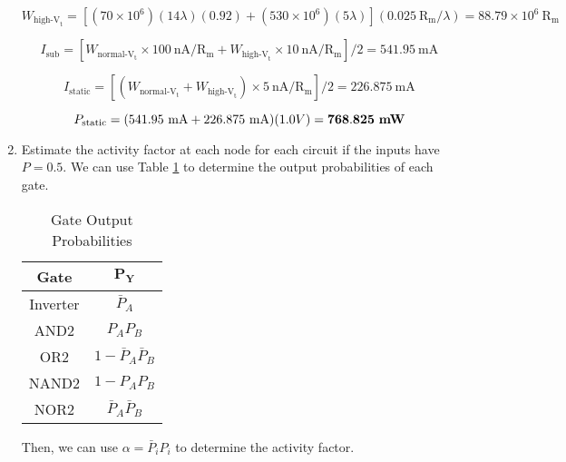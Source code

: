 \documentclass[fleqn]{article}
\begin{document}
\begin{enumerate}
		\begin{equation*}
			W_{\text{high-V}_\text{t}} = \left[(70 \times 10^6)(14\lambda)(0.92) + (530 \times 10^6)(5\lambda)\right](0.025\ \text{R}_\text{m}/\lambda) = 88.79 \times 10^6\ \text{R}_\text{m}
		\end{equation*}
		
		\begin{equation*}
			I_\text{sub} = \left[W_{\text{normal-V}_\text{t}} \times 100\ \text{nA}/\text{R}_\text{m} + W_{\text{high-V}_\text{t}} \times 10\ \text{nA}/\text{R}_\text{m}\right]/2 = 541.95\ \text{mA}
		\end{equation*}			
			
		\begin{equation*}
			I_\text{static} = \left[(W_{\text{normal-V}_\text{t}} + W_{\text{high-V}_\text{t}}) \times 5\ \text{nA}/\text{R}_\text{m}\right]/2 = 226.875\ \text{mA}
		\end{equation*}	
		
		\begin{equation*}
			P_\text{static} = (541.95\ \text{mA} + 226.875\ \text{mA})(1.0 V) = \mathbf{768.825}\ \text{\textbf{mW}}
		\end{equation*}	
		
		\item Estimate the activity factor at each node for each circuit if the inputs have $P = 0.5$. We can use Table \ref{table::gate_out_prob} to determine the output probabilities of each gate.
		
		\vspace{-24pt}	
		\begin{table}[H]
		\begin{center}
		\caption{Gate Output Probabilities}
		\label{table::gate_out_prob}
		{
		\renewcommand{\arraystretch}{1.2}	
		\begin{tabular}{| c | c |}
			\hline
			\textbf{Gate} & $\mathbf{P_Y}$\\
			\hline	
			Inverter & $\bar{P}_A$\\
			\hline	
			AND2 & $P_AP_B$\\
			\hline	
			OR2 & $1 - \bar{P}_A\bar{P}_B$\\
			\hline	
			NAND2 & $1 - P_AP_B$\\
			\hline	
			NOR2 & $\bar{P}_A\bar{P}_B$\\
			\hline
		\end{tabular}
		}
		\end{center}
		\end{table}
		\vspace{-24pt}	
		
		Then, we can use $\alpha = \bar{P}_iP_i$ to determine the activity factor.
		
	\end{enumerate}
\end{document}
